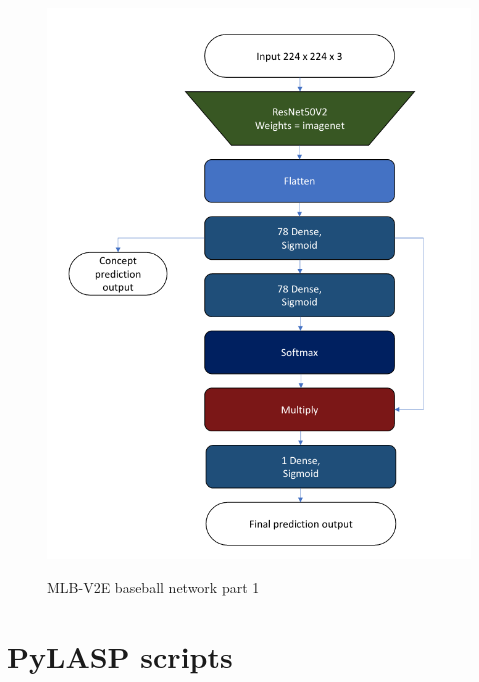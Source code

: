\begin{figure}[h]
\caption{MLB-V2E baseball network part 1}
\vspace{10pt}
\centering
\includegraphics[width=\textwidth]{appendix/birds flowers prediction network.png}
\label{birds-flowers-network}
\end{figure}

\chapter{PyLASP scripts}
\label{pylasp-scripts-appendix}

